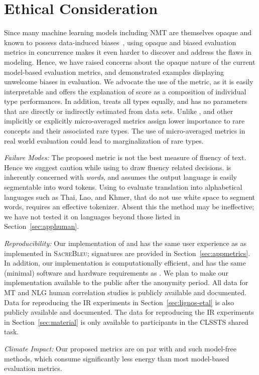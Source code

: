 \section{Ethical Consideration}

Since many machine learning models including NMT are themselves opaque and known to possess data-induced biases~\cite{prates2019-mt-bias}, using opaque and biased evaluation metrics in concurrence makes it even harder to discover and address the flaws in modeling.
Hence, we have raised concerns about the opaque nature of the current model-based evaluation metrics, and demonstrated examples displaying unwelcome biases in evaluation. We advocate the use of the  metric, as it is easily interpretable and offers the explanation of score as a composition of individual type performances.
In addition,  treats all types equally, and has no parameters that are directly or indirectly estimated from data sets. Unlike ,  and other implicitly or explicitly micro-averaged metrics assign lower importance to rare concepts and their associated rare types. 
The use of micro-averaged metrics in real world evaluation could lead to marginalization of rare types.


\textit{Failure Modes:}
The proposed  metric is not the best measure of fluency of text. 
Hence we suggest caution while using  to draw fluency related decisions.  is inherently concerned with \textit{words}, and assumes the output language is easily segmentable into word tokens. Using  to evaluate translation into alphabetical languages such as Thai, Lao, and Khmer, that do not use white space to segment words, requires an effective tokenizer. Absent this the method may be ineffective; we have not tested it on languages beyond those listed in Section~\ref{sec:apphuman}.

\textit{Reproducibility:}
Our implementation of  and  has the same user experience as \bleu{} as implemented in \textsc{SacreBleu}; signatures are provided in Section~\ref{sec:appmetrics}. 
In addition, our implementation is  computationally efficient, and has the same (minimal) software and hardware requirements as \bleu{}. 
We plan to make our implementation available to the public after the anonymity period. All data for MT and NLG human correlation studies is publicly available and documented. Data for reproducing the IR experiments in Section~\ref{sec:lignos-etal} is also publicly available and documented. The data for reproducing the IR experiments in Section~\ref{sec:material} is only available to participants in the CLSSTS shared task. 

\textit{Climate Impact:} Our proposed metrics are on par with \bleu{} and such model-free methods, which consume significantly less energy than most model-based evaluation metrics.

